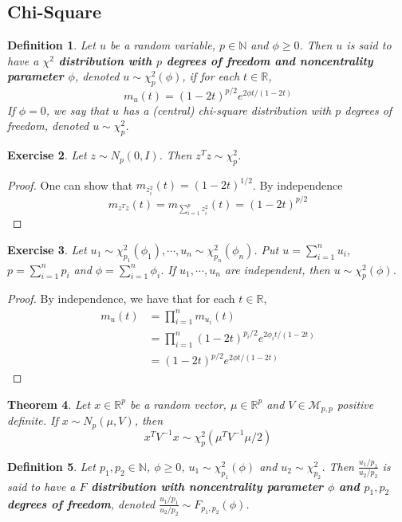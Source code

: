 \documentclass[12pt]{amsart}
\newtheorem{thm}{Theorem}[section]
\newtheorem{defn}[thm]{Definition}
\newtheorem{ex}[thm]{Exercise}
\newcommand{\N}{\mathbb{N}}
\newcommand{\R}{\mathbb{R}}
\newcommand{\MM}{\mathcal{M}}
\begin{document}
\subsection{Chi-Square}
\begin{defn} Let $u$ be a random variable, $p \in \N$ and $\phi \geq 0$. Then $u$ is said to have a \textbf{$\chi^2$ distribution with $p$ degrees of freedom and noncentrality parameter $\phi$}, denoted $u \sim \chi^2_p(\phi)$, if for each $t \in \R$, $$m_u(t) = (1-2t)^{p/2}e^{2\phi t/(1-2t)}$$ If $\phi=0$, we say that $u$ has a (central) chi-square distribution with $p$ degrees of freedom, denoted $u \sim \chi^2_p$.
\end{defn}

\begin{ex}
Let $z \sim N_p(0,I)$. Then $z^Tz \sim \chi^2_p$.
\end{ex}

\begin{proof}
One can show that $m_{z_i^2}(t) = (1-2t)^{1/2}$. By independence $$m_{z^Tz}(t) = m_{\sum_{i=1}^p z_i^2}(t) = (1-2t)^{p/2}$$
\end{proof}

\begin{ex}
Let $u_1 \sim \chi^2_{p_1}(\phi_1), \cdots, u_n \sim \chi^2_{p_n}(\phi_n)$. Put $u = \sum\limits_{i=1}^n u_i$, $p = \sum\limits_{i=1}^np_i$ and $\phi = \sum\limits_{i=1}^n\phi_i$. If $u_1, \cdots, u_n$ are independent, then $u \sim \chi^2_p(\phi)$. 
\end{ex}

\begin{proof}
By independence, we have that for each $t \in \R$, 
\begin{align*}
m_u(t) 
&= \prod\limits_{i=1}^nm_{u_i}(t) \\
&= \prod\limits_{i=1}^n (1-2t)^{p_i/2}e^{2\phi_i t/(1-2t)} \\
&= (1-2t)^{p/2}e^{2\phi t/(1-2t)} 
\end{align*}
\end{proof}

\begin{thm}
Let $x \in \R^p$ be a random vector, $\mu \in \R^p$ and $V \in \MM_{p,p}$ positive definite. If $x \sim N_p(\mu, V)$, then $$x^TV^{-1}x \sim \chi^2_p(\mu^TV^{-1}\mu /2)$$
\end{thm}

\begin{defn}
Let $p_1, p_2 \in \N$, $\phi \geq 0$, $u_1 \sim \chi^2_{p_1}(\phi)$ and $u_2 \sim \chi^2_{p_2}$. Then $\frac{u_1/p_1}{u_2/p_2}$ is said to have a \textbf{$F$ distribution with noncentrality parameter $\phi$ and $p_1, p_2$ degrees of freedom}, denoted $\frac{u_1/p_1}{u_2/p_2} \sim F_{p_1, p_2}(\phi)$. 
\end{defn}
\end{document}
